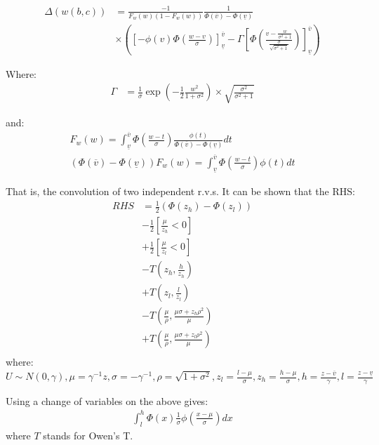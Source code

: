 \begin{align*}
    \Delta(w(b,c)) &= \frac{-1}{F_w(w)(1 - F_w(w))} \frac{1}{\Phi(\overline{v}) - \Phi(\underline{v})}  \\
    &\times\left(
        \left[ -\phi(v)\Phi\left(\frac{w - v}{\sigma}\right)\right]^{\overline{v}}_{\underline{v}} 
        - \Gamma \left[
            \Phi\left(
                \frac{v - \frac{w}{\sigma^2 + 1}}{\frac{\sigma}{\sqrt{ \sigma^2 + 1}}}
            \right)
        \right]^{\overline{v}}_{\underline{v}}
    \right)
\end{align*}

Where:
\begin{align*}
    \Gamma &= \frac{1}{\sigma}\exp\left(
        -\frac{1}{2} \frac{w^2}{1 + \sigma^2}
    \right) \times \sqrt{\frac{\sigma^2}{\sigma^2 + 1}}
\end{align*}

and:
\begin{align*}
    F_w(w) = \int^{\overline{v}}_{\underline{v}} \Phi \left(
        \frac{w - t}{\sigma}
    \right) \frac{\phi(t)}{\Phi(\overline{v}) - \Phi(\underline{v})} dt  \\
    (\Phi(\overline{v}) - \Phi(\underline{v}))F_w(w) = \int^{\overline{v}}_{\underline{v}} \Phi \left(
        \frac{w - t}{\sigma}
    \right) \phi(t) dt 
\end{align*}

That is, the convolution of two independent r.v.s. It can be shown that the RHS:
\begin{align*}
    RHS &= \frac{1}{2} \left(
        \Phi(z_h) - \Phi(z_l)
    \right)  \\
    &- \frac{1}{2} \left[
        \frac{\mu}{z_h} < 0
    \right] \\
    &+ \frac{1}{2} \left[
        \frac{\mu}{z_l} < 0
    \right] \\
    &- T\left(z_h, \frac{h}{z_h}\right) \\
    &+ T\left(z_l, \frac{l}{z_l}\right) \\
    &- T\left(\frac{\mu}{\rho}, \frac{
        \mu\sigma + z_h \rho^2
    }{
        \mu
    }\right) \\
    &+ T\left(\frac{\mu}{\rho}, \frac{
        \mu\sigma + z_l \rho^2
    }{
        \mu
    }\right) \\
\end{align*}
where: $U \sim N(0, \gamma), \mu = \gamma^{-1}z, \sigma = -\gamma^{-1}, \rho = \sqrt{1 + \sigma^2}, z_l = \frac{l - \mu}{\sigma}, z_h = \frac{h-\mu}{\sigma}, 
h = \frac{z - \overline{v}}{\gamma}, l = \frac{z - \underline{v}}{\gamma}$

Using a change of variables on the above gives:
\begin{align*}
    \int^h_l \Phi(x)\frac{1}{\sigma} \phi(\frac{x - \mu}{\sigma})dx
\end{align*}
where $T$ stands for Owen's T.

